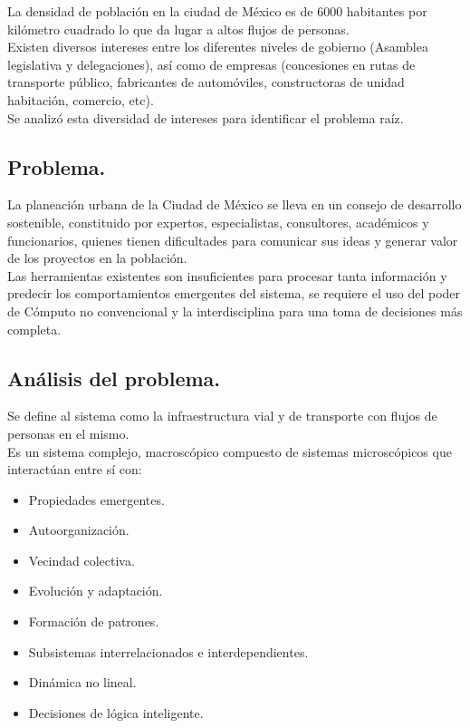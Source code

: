 \documentclass[10pt]{article}
\begin{document}
La densidad de población en la ciudad de México es de 6000 habitantes por kilómetro cuadrado lo que da lugar a altos flujos de personas.\\

Existen diversos intereses entre los diferentes niveles de gobierno (Asamblea legislativa y delegaciones), así como de empresas (concesiones en rutas de transporte público, fabricantes de automóviles, constructoras de unidad habitación, comercio, etc).\\

Se analizó esta diversidad de intereses para identificar el problema raíz.\\

\newpage
\subsection{Problema.}

La planeación urbana de la Ciudad de México se lleva en un consejo de desarrollo sostenible, constituido por expertos, especialistas, consultores, académicos y funcionarios, quienes tienen dificultades para comunicar sus ideas y generar valor de los proyectos en la población.\\

Las herramientas existentes son insuficientes para procesar tanta información y predecir los comportamientos emergentes del sistema, se requiere el uso del poder de Cómputo no convencional y la interdisciplina para una toma de decisiones más completa.

\subsection{Análisis del problema.}

Se define al sistema como la infraestructura vial y de transporte con flujos de personas en el mismo.\\
Es un sistema complejo, macroscópico compuesto de sistemas microscópicos que interactúan entre sí con:\\
\begin{itemize}
	\item Propiedades emergentes.
	\item Autoorganización.
	\item Vecindad colectiva.
	\item Evolución y adaptación.
	\item Formación de patrones.
	\item Subsistemas interrelacionados e interdependientes.
	\item Dinámica no lineal.
	\item Decisiones de lógica inteligente. \\
\end{itemize}
	
\end{document}

